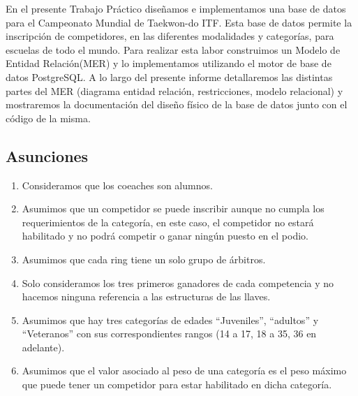 En el presente Trabajo Práctico diseñamos e implementamos una base de datos para el Campeonato Mundial de Taekwon-do ITF. Esta
base de datos permite la inscripción de competidores, en las diferentes modalidades y categorías, para escuelas de todo el mundo.
Para realizar esta labor construimos un Modelo de Entidad Relación(MER) y lo implementamos utilizando el motor de base
de datos PostgreSQL. A lo largo del presente informe detallaremos las distintas partes del MER (diagrama entidad relación, restricciones,
modelo relacional) y mostraremos la documentación del diseño físico de la base de datos junto con el código de la misma.

\subsection{Asunciones}
\begin{enumerate}
	\item Consideramos que los coeaches son alumnos.
	\item Asumimos que un competidor se puede inscribir aunque no cumpla los requerimientos de la categoría, en este caso, el competidor no estará habilitado y no podrá competir o ganar ningún puesto en el podio.
	\item Asumimos que cada ring tiene un solo grupo de árbitros.
	\item Solo consideramos los tres primeros ganadores de cada competencia y no hacemos ninguna referencia a las estructuras de las llaves.
	\item Asumimos que hay tres categorías de edades ``Juveniles'', ``adultos'' y ``Veteranos'' con sus correspondientes rangos (14 a 17, 18 a 35, 36 en adelante).
	\item Asumimos que el valor asociado al peso de una categoría es el peso máximo que puede tener un competidor para estar habilitado en dicha categoría.
\end{enumerate}